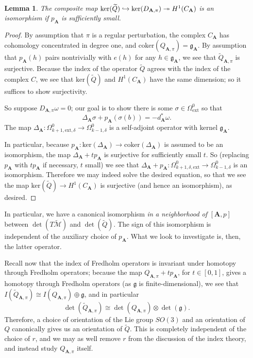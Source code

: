 \documentclass{memo-l}
\newtheorem{lemma}[theorem]{Lemma}
\theoremstyle{definition}
\theoremstyle{remark}
\numberwithin{section}{chapter}
\numberwithin{equation}{chapter}
\begin{document}
\begin{lemma}The composite map $\textup{ker}(\widetilde Q) \hookrightarrow \textup{ker}(D_{\mathbf{A},\pi}) \twoheadrightarrow H^1(C_{\mathbf{A}})$ is an isomorphism if $p_{\mathbf{A}}$ is sufficiently small.
\end{lemma}
\begin{proof}By assumption that $\pi$ is a regular perturbation, the complex $C_{\mathbf{A}}$ has cohomology concentrated in degree one, and $\text{coker}(Q_{\mathbf{A},\pi}) = \mathfrak g_{\mathbf{A}}$. By assumption that $p_{\mathbf{A}}(h)$ pairs nontrivially with $e(h)$ for any $h \in \mathfrak g_{\mathbf{A}}$, we see that $\widetilde Q_{\mathbf{A},\pi}$ is surjective. Because the index of the operator $\widetilde Q$ agrees with the index of the complex $C$, we see that $\text{ker}(\widetilde Q)$ and $H^1(C_{\mathbf{A}})$ have the same dimension; so it suffices to show surjectivity.

So suppose $D_{\mathbf{A},\pi} \omega = 0$; our goal is to show there is some $\sigma \in \Omega^0_{\text{ext}}$ so that 
$$\Delta_{\mathbf A} \sigma + p_{\mathbf{A}}(\sigma(b)) = - d_{\mathbf A}^*\omega.$$ 
The map $\Delta_{\mathbf{A}}: \Omega^0_{k+1,\text{ext},\delta} \to \Omega^0_{k-1,\delta}$ is a self-adjoint operator with kernel $\mathfrak g_{\mathbf{A}}$.

In particular, because $p_{\mathbf{A}}: \text{ker}(\Delta_{\mathbf{A}}) \to \text{coker}(\Delta_{\mathbf{A}})$ is assumed to be an isomorphism, the map $\Delta_{\mathbf{A}} + tp_{\mathbf{A}}$ is surjective for sufficiently small $t$. So (replacing $p_{\mathbf{A}}$ with $tp_{\mathbf{A}}$ if necessary, $t$ small) we see that $\Delta_{\mathbf{A}} + p_{\mathbf{A}}: \Omega^0_{k+1,\delta,\text{ext}} \to \Omega^0_{k-1,\delta}$ is an isomorphism. Therefore we may indeed solve the desired equation, so that we see the map $\text{ker}(\widetilde Q) \to H^1(C_{\mathbf{A}})$ is surjective (and hence an isomorphism), as desired.
\end{proof}

In particular, we have a canonical isomorphism \emph{in a neighborhood of $[\mathbf{A},p]$} between $\det(T\widetilde{\mathcal M})$ and $\det(\widetilde Q)$. The sign of this isomorphism is independent of the auxiliary choice of $p_{\mathbf{A}}$. What we look to investigate is, then, the latter operator.

Recall now that the index of Fredholm operators is invariant under homotopy through Fredholm operators; because the map $Q_{\mathbf{A},\pi} + tp_{\mathbf{A}}$, for $t \in [0,1]$, gives a homotopy through Fredholm operators (as $\mathfrak g$ is finite-dimensional), we see that $I(\widetilde{Q}_{\mathbf{A},\pi}) \cong I(Q_{\mathbf{A},\pi}) \oplus \mathfrak g$, and in particular 
$$\det(\widetilde{Q}_{\mathbf{A},\pi}) \cong \det(Q_{\mathbf{A},\pi}) \otimes \det(\mathfrak g).$$ 
Therefore, a choice of orientation of the Lie group $SO(3)$ and an orientation of $Q$ canonically gives us an orientation of $\widetilde Q$. This is completely independent of the choice of $r$, and we may as well remove $r$ from the discussion of the index theory, and instead study $Q_{\mathbf{A},\pi}$ itself. 
\end{document}
